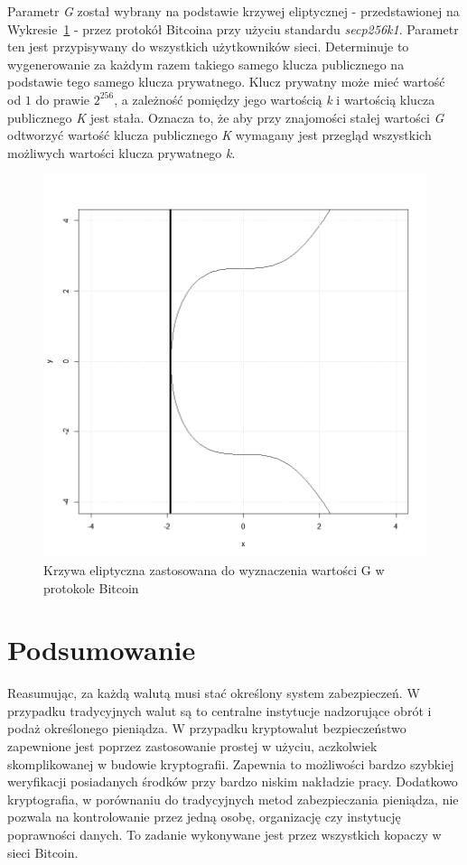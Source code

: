 \documentclass[12pt, oneside, final, openany]{mgr}
\begin{document}
\indent Parametr \textit{G} został wybrany na podstawie krzywej eliptycznej - przedstawionej na Wykresie~\ref{fig:krzywaEliptyczna} - przez protokół Bitcoina przy użyciu standardu \textit{secp256k1}. Parametr ten jest przypisywany do wszystkich użytkowników sieci. Determinuje to wygenerowanie za każdym razem takiego samego klucza publicznego na podstawie tego samego klucza prywatnego. Klucz prywatny może mieć wartość od $1$ do prawie $2^{256}$, a zależność pomiędzy jego wartością \textit{k} i wartością klucza publicznego \textit{K} jest stała. Oznacza to, że aby przy znajomości stałej wartości \textit{G} odtworzyć wartość klucza publicznego \textit{K} wymagany jest przegląd wszystkich możliwych wartości klucza prywatnego \textit{k}. 
\if@archive\else{\newpage}\fi
\vfill
\begin{figure}[!h]
\centering
\includegraphics[width=0.9\linewidth]{pictures/elliptic.png}
\caption{Krzywa eliptyczna zastosowana do wyznaczenia wartości G w protokole Bitcoin}
\label{fig:krzywaEliptyczna}
\end{figure}

\section{Podsumowanie} \label{sec:podsumowanieKryptowaluty}
\indent Reasumując, za każdą walutą musi stać określony system zabezpieczeń. W przypadku tradycyjnych walut są to centralne instytucje nadzorujące obrót i podaż określonego pieniądza. W przypadku kryptowalut bezpieczeństwo zapewnione jest poprzez zastosowanie prostej w użyciu, aczkolwiek skomplikowanej w budowie kryptografii. Zapewnia to możliwości bardzo szybkiej weryfikacji posiadanych środków przy bardzo niskim nakładzie pracy. Dodatkowo kryptografia, w porównaniu do tradycyjnych metod zabezpieczania pieniądza, nie pozwala na kontrolowanie przez jedną osobę, organizację czy instytucję poprawności danych. To zadanie wykonywane jest przez wszystkich kopaczy w sieci Bitcoin. 
\end{document}
